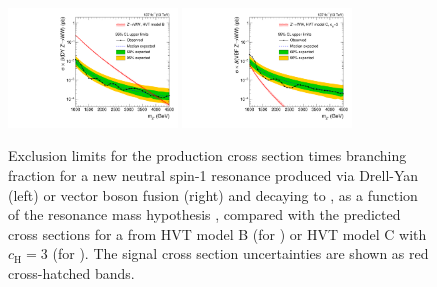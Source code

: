\begin{figure}[htbp]
  \centering
  \includegraphics[width=0.4\textwidth]{fig/results/limits_ZprToWW.pdf}
  \includegraphics[width=0.4\textwidth]{fig/results/limits_VBFZprToWW.pdf}
  \caption{
    Exclusion limits for the production cross section times branching fraction for a new neutral spin-1 resonance produced via Drell-Yan (left) or vector boson fusion (right) and decaying to \WW, as a function of the resonance mass hypothesis \MX, compared with the predicted cross sections for a \Zpr from HVT model B (for \DY) or HVT model C with $c_\mathrm{H}=3$ (for \VBF).
    The signal cross section uncertainties are shown as red cross-hatched bands.
  }
  \label{fig:limits_spin1_neut}
\end{figure}

